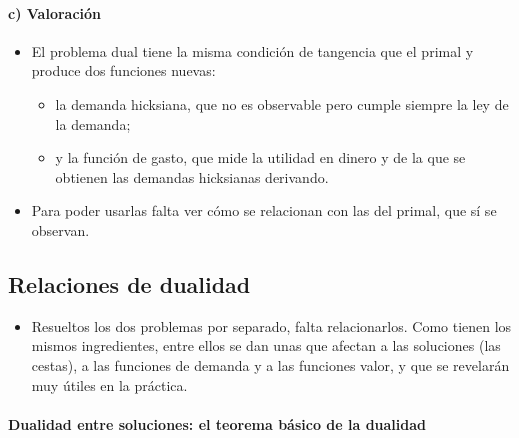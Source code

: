 \documentclass[11pt]{article}
\begin{document}
\paragraph{c) Valoración}

\begin{itemize}
\item El problema dual tiene la misma condición de tangencia que el primal y produce dos funciones nuevas:
  \begin{itemize}
  \item la demanda hicksiana, que no es observable pero cumple siempre la ley de la demanda;
  \item y la función de gasto, que mide la utilidad en dinero y de la que se obtienen las demandas hicksianas derivando.
  \end{itemize}
\item Para poder usarlas falta ver cómo se relacionan con las del primal, que sí se observan.
\end{itemize}

\subsection{Relaciones de dualidad}\label{sec:relaciones-dualidad}

\begin{itemize}
\item Resueltos los dos problemas por separado, falta relacionarlos. Como tienen los mismos ingredientes, entre ellos se dan unas  que afectan a las soluciones (las cestas), a las funciones de demanda y a las funciones valor, y que se revelarán muy útiles en la práctica.
\end{itemize}

\paragraph{Dualidad entre soluciones: el teorema básico de la dualidad}
\end{document}
